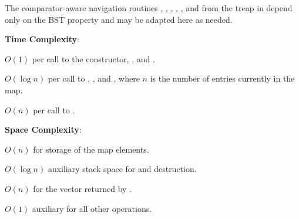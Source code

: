 The comparator-aware navigation routines , , , , , and  from the treap in  depend only on the BST property and may be adapted here as needed.

\textbf{Time Complexity}:
\begin{compactitem}
  \item $O(1)$ per call to the constructor, , and .
  \item $O(\log n)$ per call to , , and , where $n$ is the number of entries currently in the map.
  \item $O(n)$ per call to .
\end{compactitem}

\textbf{Space Complexity}:
\begin{compactitem}
  \item $O(n)$ for storage of the map elements.
  \item $O(\log n)$ auxiliary stack space for  and destruction.
  \item $O(n)$ for the vector returned by .
  \item $O(1)$ auxiliary for all other operations.
\end{compactitem}

